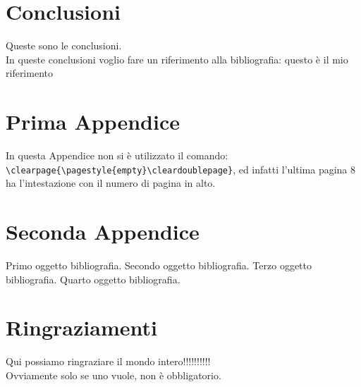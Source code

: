\documentclass[12pt,a4paper,openright,twoside]{report}
\renewcommand{\chaptermark}[1]{\markboth{\thechapter.\ #1}{}}
\begin{document}
\chapter*{Conclusioni}
 Queste sono le
conclusioni.\\
In queste conclusioni voglio fare un riferimento alla
bibliografia: questo \`e il mio riferimento %
\renewcommand{\chaptermark}[1]{\markright{\thechapter \ #1}{}}
\lhead[\fancyplain{}{\bfseries\thepage}]{\fancyplain{}{\bfseries\rightmark}}
\appendix                               %
\chapter{Prima Appendice}               %
In questa Appendice non si \`e utilizzato il comando:\\
\verb"\clearpage{\pagestyle{empty}\cleardoublepage}", ed infatti
l'ultima pagina 8 ha l'intestazione con il numero di pagina in
alto.
\chapter{Seconda Appendice}             %
\begin{thebibliography}{90}             %
\rhead[\fancyplain{}{\bfseries \leftmark}]{\fancyplain{}{\bfseries
\thepage}}
 Primo oggetto bibliografia.
 Secondo oggetto bibliografia.
 Terzo oggetto bibliografia.
 Quarto oggetto bibliografia.
\end{thebibliography}
\clearpage{\pagestyle{empty}\cleardoublepage}
\chapter*{Ringraziamenti}
\thispagestyle{empty}
Qui possiamo ringraziare il mondo intero!!!!!!!!!!\\
Ovviamente solo se uno vuole, non \`e obbligatorio.
\end{document}
